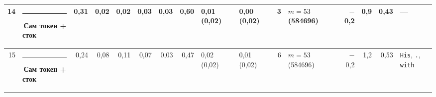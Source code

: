 \documentclass[10pt]{article}
\begin{document}
\begin{minipage}{\linewidth}
\begin{center}
{\begin{tabular}{|r|l|r|r|r|r|r|r|l|l|r|l|r|r|r|l|}
14 & \textcolor[HTML]{2A78D6}{\rule{0.62em}{0.62em}}\,\textbf{Сам токен + сток} & 0,31 & 0,02 & 0,02 & 0,03 & 0,03 & 0,60 & 0,01 (0,02) & 0,00 (0,02) & 3 & $m{=}53$ (584696) & $-$0,2 & 0,9 & 0,43 & — \\ \hline
15 & \textcolor[HTML]{2A78D6}{\rule{0.62em}{0.62em}}\,\textbf{Сам токен + сток} & 0,24 & 0,08 & 0,11 & 0,07 & 0,03 & 0,47 & 0,02 (0,02) & 0,01 (0,02) & 6 & $m{=}53$ (584696) & $-$0,2 & 1,2 & 0,53 & \texttt{\textvisiblespace{}His}, \texttt{\textvisiblespace{}.}, \texttt{\textvisiblespace{}with} \\ \hline
\hline\end{tabular}}\end{center}
\end{minipage}
\par\vspace{0.4em}
\end{document}
